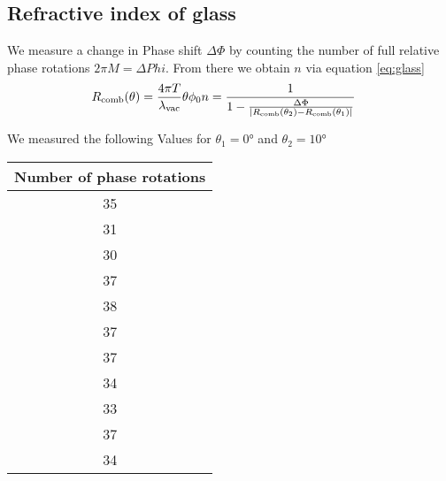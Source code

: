 \subsection{Refractive index of glass}
We measure a change in Phase shift $\Delta \Phi$ by counting the number
of full relative phase rotations $2 \pi M = \Delta Phi$.
From there we obtain $n$ via equation \eqref{eq:glass}
\begin{align}
	R_\text{comb}(\theta) = \frac{4\pi T}{\lambda_\text{vac}}\theta\phi_0
	n & = \frac{1}{1-\frac{\Delta \Phi}{\left|R_\text{comb}(\theta_{2})-R_\text{comb}(\theta_{1})\right|} }
\end{align}

We measured the following Values for $\theta_1 = 0°$ and $\theta_2 = 10°$
\begin{table}[H]
	\centering
	\begin{tabular}{c}
		\toprule
		Number of phase rotations \\
		\midrule
		35                        \\
		31                        \\
		30                        \\
		37                        \\
		38                        \\
		37                        \\
		37                        \\
		34                        \\
		33                        \\
		37                        \\
		34                        \\
		\bottomrule
	\end{tabular}
\end{table}

